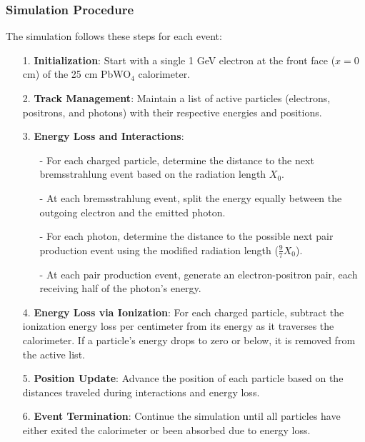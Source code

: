 \documentclass[twocolumn]{aastex631}
\begin{document}
\subsubsection{Simulation Procedure} 

The simulation follows these steps for each event: 

\begin{enumerate}
    \item[1.] \textbf{Initialization}: Start with a single 1 GeV electron at the
          front face (\(x = 0\) cm) of the 25 cm PbWO\(_4\) calorimeter.
      \item[2.] \textbf{Track Management}: Maintain a list of active particles
          (electrons, positrons, and photons) with their respective energies and
          positions.
      \item[3.] \textbf{Energy Loss and Interactions}:
      \begin{itemize}
          \item[-] For each charged particle, determine the distance to the next
              bremsstrahlung event based on the radiation length \(X_0\).
          \item[-] At each bremsstrahlung event, split the energy equally between the
              outgoing electron and the emitted photon.
          \item[-] For each photon, determine the distance to the possible next pair
              production event using the modified radiation length (\(\frac{9}{7}
              X_0\)).
          \item[-] At each pair production event, generate an electron-positron pair,
              each receiving half of the photon's energy.
      \end{itemize}
  \item[4.] \textbf{Energy Loss via Ionization}: For each charged particle,
          subtract the ionization energy loss per centimeter from its energy as it
          traverses the calorimeter. If a particle's energy drops to zero or
          below, it is removed from the active list.
      \item[5.] \textbf{Position Update}: Advance the position of each particle based
          on the distances traveled during interactions and energy loss.
      \item[6.] \textbf{Event Termination}: Continue the simulation until all
          particles have either exited the calorimeter or been absorbed due to
          energy loss.
  \end{enumerate}
\end{document}
